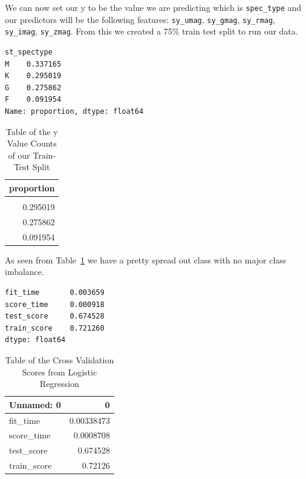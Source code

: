 \documentclass[
  letterpaper,
  DIV=11,
  numbers=noendperiod]{scrartcl}
\begin{document}
We can now set our y to be the value we are predicting which is
\texttt{spec\_type} and our predictors will be the following features:
\texttt{sy\_umag}, \texttt{sy\_gmag}, \texttt{sy\_rmag},
\texttt{sy\_imag}, \texttt{sy\_zmag}. From this we created a 75\% train
test split to run our data.

\begin{verbatim}
st_spectype
M    0.337165
K    0.295019
G    0.275862
F    0.091954
Name: proportion, dtype: float64
\end{verbatim}

\begin{longtable}[]{@{}r@{}}

\caption{\label{tbl-y-train-test-values}Table of the y Value Counts of
our Train-Test Split}

\tabularnewline

\toprule\noalign{}
proportion \\
\midrule\noalign{}
\endhead
\bottomrule\noalign{}
\endlastfoot
0.337165 \\
0.295019 \\
0.275862 \\
0.091954 \\

\end{longtable}

As seen from Table~\ref{tbl-y-train-test-values} we have a pretty spread
out class with no major class imbalance.

\begin{verbatim}
fit_time       0.003659
score_time     0.000918
test_score     0.674528
train_score    0.721260
dtype: float64
\end{verbatim}

\begin{longtable}[]{@{}lr@{}}

\caption{\label{tbl-lr-cross\_validate}Table of the Cross Validation
Scores from Logistic Regression}

\tabularnewline

\toprule\noalign{}
Unnamed: 0 & 0 \\
\midrule\noalign{}
\endhead
\bottomrule\noalign{}
\endlastfoot
fit\_time & 0.00338473 \\
score\_time & 0.0008708 \\
test\_score & 0.674528 \\
train\_score & 0.72126 \\

\end{longtable}
\end{document}
